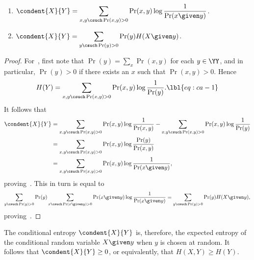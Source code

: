 \begin{lemma}
\begin{enumerate}
\item
{}
$\displaystyle
\condent{X}{Y} = \sum_{x, y \csuch \Pr(x, y) > 0} \Pr(x, y) \log
\frac{1}{\Pr(x \given y)}$.
\item
{}
$\displaystyle
\condent{X}{Y} = \sum_{y \csuch \Pr(y) > 0} \Pr(y) H(X \given y)$.
\end{enumerate}
\end{lemma}

\begin{proof}
For~, first note that $\Pr(y) = \sum_x \Pr(x, y)$
for each $y \in \YY$, and in particular, $\Pr(y) > 0$ if there exists an
$x$ such that $\Pr(x, y) > 0$.  Hence
% 
\begin{equation}
H(Y)    %
=
\sum_{x, y \csuch \Pr(x, y) > 0} \Pr(x, y) \log \frac{1}{\Pr(y)}.
\lbl{eq:ca-1}
\end{equation}
% 
It follows that
% 
\begin{align*}
\condent{X}{Y}  &
=
\sum_{x, y \csuch \Pr(x, y) > 0} \Pr(x, y) \log \frac{1}{\Pr(x, y)}
-
\sum_{x, y \csuch \Pr(x, y) > 0} \Pr(x, y) \log \frac{1}{\Pr(y)}      
\nonumber       \\
&
=
\sum_{x, y \csuch \Pr(x, y) > 0} 
\Pr(x, y) \log \frac{\Pr(y)}{\Pr(x, y)} \\
&
=
\sum_{x, y \csuch \Pr(x, y) > 0} 
\Pr(x, y) \log \frac{1}{\Pr(x \given y)},
\end{align*}
% 
proving~.  This in turn is equal to 
\[
\sum_{y \csuch \Pr(y) > 0} \Pr(y)
\sum_{x \csuch \Pr(x \given y) > 0} 
\Pr(x \given y) \log \frac{1}{\Pr(x \given y)}
=
\sum_{y \csuch \Pr(y) > 0} \Pr(y) H(X \given y),
\]
% 
proving~.
\end{proof}

The conditional entropy $\condent{X}{Y}$ is, therefore, the expected
entropy of the conditional random variable $X \given y$ when $y$ is chosen
at random.  It follows that $\condent{X}{Y} \geq 0$, or equivalently, that
$H(X, Y) \geq H(Y)$.



